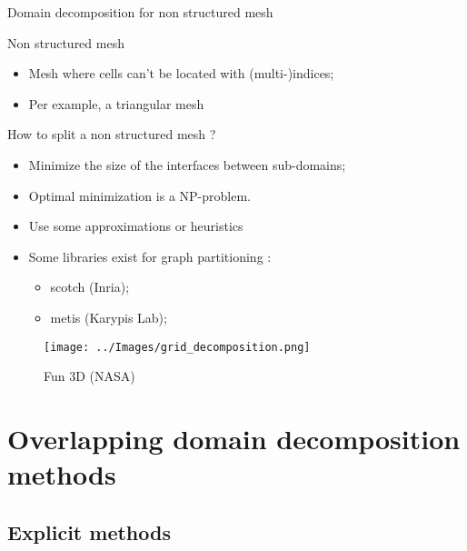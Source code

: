 \documentclass[compress,10pt,aspectratio=169]{beamer}
\begin{document}
\begin{frame}[fragile]{Domain decomposition for non structured mesh}
    \scriptsize

    \begin{multicols}{2}
    \begin{block}{\small Non structured mesh}
        \begin{itemize}
            \item Mesh where cells can't be located with (multi-)indices;
            \item Per example, a triangular mesh
        \end{itemize}
    \end{block}

    \begin{exampleblock}{\small How to split a non structured mesh ?}
        \begin{itemize}
            \item Minimize the size of the interfaces between sub-domains;
            \item Optimal minimization is a NP-problem. 
            \item Use some approximations or heuristics
            \item Some libraries exist for graph partitioning :
            \begin{itemize}
                \item {\scriptsize scotch (Inria);}
                \item {\scriptsize metis (Karypis Lab)};
            \end{itemize}
        \end{itemize}
    \end{exampleblock}

    \begin{figure}[h]
    \texttt{[image: ../Images/grid\_decomposition.png]}
    \caption{Fun 3D (NASA)}
    \end{figure}
\end{multicols}
\end{frame}

\section{Overlapping domain decomposition methods}



\subsection{Explicit methods}
\end{document}
